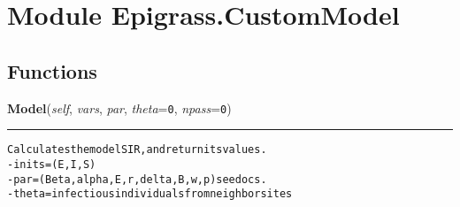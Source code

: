 %
%
%


\section{Module Epigrass.CustomModel}

    \label{Epigrass:CustomModel}


  \subsection{Functions}

    \label{Epigrass:CustomModel:Model}

    \vspace{0.5ex}

    \begin{boxedminipage}{\textwidth}

    \raggedright \textbf{Model}(\textit{self}, \textit{vars}, \textit{par}, \textit{theta}=\texttt{0}, \textit{npass}=\texttt{0})

    \vspace{-1.5ex}

    \rule{\textwidth}{0.5\fboxrule}
\begin{alltt}

Calculates the model SIR, and return its values.
- inits = (E,I,S)
- par = (Beta, alpha, E,r,delta,B, w, p) see docs.
- theta = infectious individuals from neighbor sites
\end{alltt}

    \vspace{1ex}

    \end{boxedminipage}

